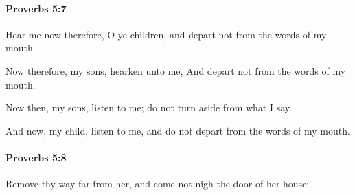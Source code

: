 		\paragraph{Proverbs 5:7} %
			\label{PROVERBS-5-7}

			Hear me now therefore, O ye children, and depart not from the words of my mouth.

			\begin{versebox}
					\item[BHS] 
					\item[ASV] Now therefore, my sons, hearken unto me, And depart not from the words of my mouth.
					\item[NIV] Now then, my sons, listen to me; do not turn aside from what I say.
					\item[NRSV] And now, my child, listen to me, and do not depart from the words of my mouth.
			\end{versebox}

		\paragraph{Proverbs 5:8} %
			\label{PROVERBS-5-8}

			Remove thy way far from her, and come not nigh the door of her house:

